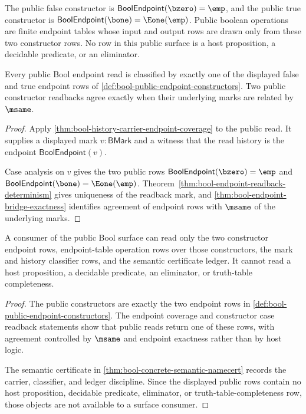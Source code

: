 \begin{definition}
\label{def:bool-public-endpoint-constructors}
The public false constructor is $\mathsf{BoolEndpoint}(\bzero)=\emp$, and the
public true constructor is $\mathsf{BoolEndpoint}(\bone)=\Eone(\emp)$. Public boolean
operations are finite endpoint tables whose input and output rows are drawn
only from these two constructor rows. No row in this public surface is a host
proposition, a decidable predicate, or an eliminator.
\end{definition}

\begin{theorem}
\label{thm:bool-public-constructor-case-readback}
Every public Bool endpoint read is classified by exactly one of the displayed false
and true endpoint rows of \autoref{def:bool-public-endpoint-constructors}. Two
public constructor readbacks agree exactly when their underlying marks are
related by $\msame$.
\end{theorem}
\begin{proof}
Apply \autoref{thm:bool-history-carrier-endpoint-coverage} to the public read.
It supplies a displayed mark $v:\mathsf{BMark}$ and a witness that the read
history is the endpoint $\mathsf{BoolEndpoint}(v)$.

Case analysis on $v$ gives the two public rows
$\mathsf{BoolEndpoint}(\bzero)=\emp$ and $\mathsf{BoolEndpoint}(\bone)=\Eone(\emp)$.
Theorem~\ref{thm:bool-endpoint-readback-determinism}
gives uniqueness of the readback mark, and
\autoref{thm:bool-endpoint-bridge-exactness} identifies agreement of endpoint
rows with $\msame$ of the underlying marks.
\end{proof}

\begin{theorem}
\label{thm:bool-public-surface-no-hidden-leakage}
A consumer of the public Bool surface can read only the two constructor endpoint rows,
endpoint-table operation rows over those constructors, the mark and history
classifier rows, and the semantic certificate ledger. It cannot read a host
proposition, a decidable predicate, an eliminator, or truth-table completeness.
\end{theorem}
\begin{proof}
The public constructors are exactly the two endpoint rows in
\autoref{def:bool-public-endpoint-constructors}. The endpoint coverage and
constructor case readback statements show that public reads return one of these rows,
with agreement controlled by $\msame$ and endpoint exactness rather than by host logic.

The semantic certificate in \autoref{thm:bool-concrete-semantic-namecert}
records the carrier, classifier, and ledger discipline. Since the displayed
public rows contain no host proposition, decidable predicate, eliminator, or
truth-table-completeness row, those objects are not available to a surface
consumer.
\end{proof}

